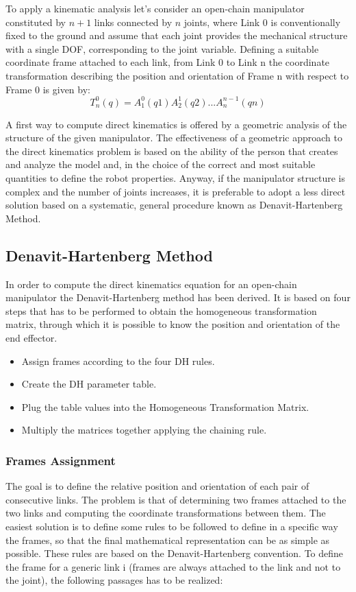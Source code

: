 To apply a kinematic analysis let's consider an open-chain manipulator constituted by $n + 1$ links connected by $n$ joints, where Link 0 is conventionally fixed to the ground and assume that each joint provides the mechanical structure with a single DOF, corresponding to the joint variable. Defining a suitable coordinate frame attached to each link, from Link 0 to Link n the coordinate transformation describing the position and orientation of Frame n with respect to Frame 0 is given by:
\[T_n^0(q) = A_1^0(q1)A_2^1(q2)...A_n^{n-1}(qn)\]


A first way to compute direct kinematics is offered by a geometric analysis of the structure of the given manipulator. The effectiveness of a geometric approach to the direct kinematics problem is based on the ability of the person that creates and analyze the model and, in the choice of the correct and most suitable quantities to define the robot properties. Anyway, if the manipulator structure is complex and the number of joints increases, it is preferable to adopt a less direct solution based on a systematic, general procedure known as Denavit-Hartenberg Method.

\subsection{Denavit-Hartenberg Method}
In order to compute the direct kinematics equation for an open-chain manipulator the Denavit-Hartenberg method has been derived. It is based on four steps that has to be performed to obtain the homogeneous transformation matrix, through which it is possible to know the position and orientation of the end effector. 
\begin{itemize}
    \item Assign frames according to the four DH rules.
    \item Create the DH parameter table.
    \item Plug the table values into the Homogeneous Transformation Matrix.
    \item Multiply the matrices together applying the chaining rule.
\end{itemize}


\subsubsection{Frames Assignment}
 The goal is to define the relative position and orientation of each pair of consecutive links. The problem is that of determining two frames attached to the two links and computing the coordinate transformations between them. The easiest solution is to define some rules to be followed to define in a specific way the frames, so that the final mathematical representation can be as simple as possible. These rules are based on the Denavit-Hartenberg convention. To define the frame for a generic link i (frames are always attached to the link and not to the joint), the following passages has to be realized:

